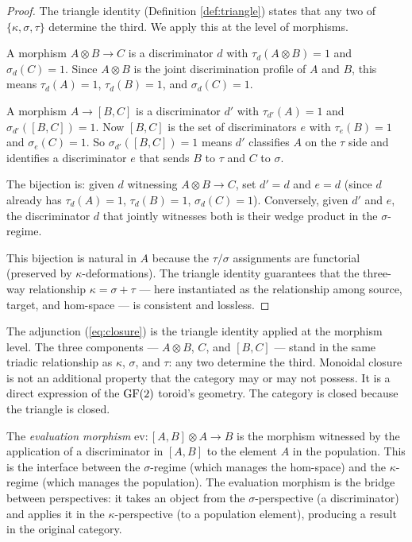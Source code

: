 \begin{proof}
The triangle identity (Definition \ref{def:triangle})
states that any two of $\{\kappa, \sigma, \tau\}$
determine the third. We apply this at the level of
morphisms.

A morphism $A \otimes B \to C$ is a discriminator $d$
with $\tau_d(A \otimes B) = 1$ and $\sigma_d(C) = 1$.
Since $A \otimes B$ is the joint discrimination profile
of $A$ and $B$, this means $\tau_d(A) = 1$,
$\tau_d(B) = 1$, and $\sigma_d(C) = 1$.

A morphism $A \to [B,C]$ is a discriminator $d'$
with $\tau_{d'}(A) = 1$ and $\sigma_{d'}([B,C]) = 1$.
Now $[B,C]$ is the set of discriminators $e$ with
$\tau_e(B) = 1$ and $\sigma_e(C) = 1$. So
$\sigma_{d'}([B,C]) = 1$ means $d'$ classifies $A$ on
the $\tau$ side and identifies a discriminator $e$
that sends $B$ to $\tau$ and $C$ to $\sigma$.

The bijection is: given $d$ witnessing $A \otimes B \to C$,
set $d' = d$ and $e = d$ (since $d$ already has
$\tau_d(A) = 1$, $\tau_d(B) = 1$, $\sigma_d(C) = 1$).
Conversely, given $d'$ and $e$, the discriminator $d$
that jointly witnesses both is their wedge product in the
$\sigma$-regime.

This bijection is natural in $A$ because the $\tau/\sigma$
assignments are functorial (preserved by $\kappa$-deformations).
The triangle identity guarantees that the three-way
relationship $\kappa = \sigma + \tau$ --- here
instantiated as the relationship among source, target,
and hom-space --- is consistent and lossless.
\end{proof}

\begin{remark}
The adjunction (\ref{eq:closure}) is the triangle identity
applied at the morphism level. The three components ---
$A \otimes B$, $C$, and $[B,C]$ --- stand in the same
triadic relationship as $\kappa$, $\sigma$, and $\tau$:
any two determine the third. Monoidal closure is not an
additional property that the category may or may not
possess. It is a direct expression of the $\operatorname{GF}(2)$
toroid's geometry. The category is closed because the
triangle is closed.
\end{remark}

\begin{definition}\label{def:eval}
The \emph{evaluation morphism}
$\mathrm{ev}: [A, B] \otimes A \to B$ is the morphism
witnessed by the application of a discriminator in $[A,B]$
to the element $A$ in the population. This is the interface
between the $\sigma$-regime (which manages the hom-space)
and the $\kappa$-regime (which manages the population).
The evaluation morphism is the bridge between perspectives:
it takes an object from the $\sigma$-perspective (a
discriminator) and applies it in the $\kappa$-perspective
(to a population element), producing a result in the
original category.
\end{definition}


